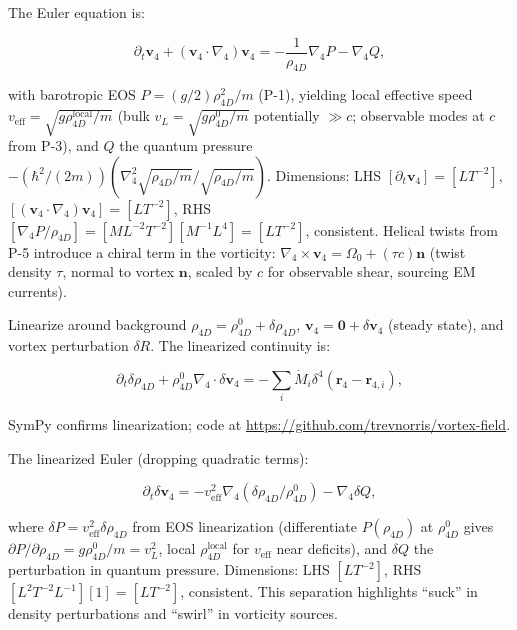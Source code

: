 The Euler equation is:

\begin{equation}
\partial_t \mathbf{v}_4 + (\mathbf{v}_4 \cdot \nabla_4) \mathbf{v}_4 = -\frac{1}{\rho_{4D}} \nabla_4 P - \nabla_4 Q,
\end{equation}

with barotropic EOS $P = (g/2) \rho_{4D}^2 / m$ (P-1), yielding local effective speed $v_{\text{eff}} = \sqrt{g \rho_{4D}^{\text{local}} / m}$ (bulk $v_L = \sqrt{g \rho_{4D}^0 / m}$ potentially $\gg c$; observable modes at $c$ from P-3), and $Q$ the quantum pressure $-(\hbar^2 / (2m)) (\nabla_4^2 \sqrt{\rho_{4D}/m} / \sqrt{\rho_{4D}/m})$. Dimensions: LHS $[\partial_t \mathbf{v}_4] = [L T^{-2}]$, $[(\mathbf{v}_4 \cdot \nabla_4) \mathbf{v}_4] = [L T^{-2}]$, RHS $[\nabla_4 P / \rho_{4D}] = [M L^{-2} T^{-2}] [M^{-1} L^{4}] = [L T^{-2}]$, consistent. Helical twists from P-5 introduce a chiral term in the vorticity: $\nabla_4 \times \mathbf{v}_4 = \Omega_0 + (\tau c) \mathbf{n}$ (twist density $\tau$, normal to vortex $\mathbf{n}$, scaled by $c$ for observable shear, sourcing EM currents).

Linearize around background $\rho_{4D} = \rho_{4D}^0 + \delta \rho_{4D}$, $\mathbf{v}_4 = \mathbf{0} + \delta \mathbf{v}_4$ (steady state), and vortex perturbation $\delta R$. The linearized continuity is:

\begin{equation}
\partial_t \delta \rho_{4D} + \rho_{4D}^0 \nabla_4 \cdot \delta \mathbf{v}_4 = -\sum_i \dot{M}_i \delta^4(\mathbf{r}_4 - \mathbf{r}_{4,i}),
\end{equation}

SymPy confirms linearization; code at \url{https://github.com/trevnorris/vortex-field}.

The linearized Euler (dropping quadratic terms):

\begin{equation}
\partial_t \delta \mathbf{v}_4 = -v_{\text{eff}}^2 \nabla_4 (\delta \rho_{4D} / \rho_{4D}^0) - \nabla_4 \delta Q,
\end{equation}

where $\delta P = v_{\text{eff}}^2 \delta \rho_{4D}$ from EOS linearization (differentiate $P(\rho_{4D})$ at $\rho_{4D}^0$ gives $\partial P / \partial \rho_{4D} = g \rho_{4D}^0 / m = v_L^2$, local $\rho_{4D}^{\text{local}}$ for $v_{\text{eff}}$ near deficits), and $\delta Q$ the perturbation in quantum pressure. Dimensions: LHS $[L T^{-2}]$, RHS $[L^2 T^{-2} L^{-1}] [1] = [L T^{-2}]$, consistent. This separation highlights ``suck'' in density perturbations and ``swirl'' in vorticity sources.

